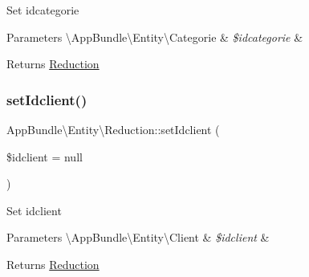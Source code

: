 Set idcategorie


\begin{DoxyParams}[1]{Parameters}
\textbackslash{}\+App\+Bundle\textbackslash{}\+Entity\textbackslash{}\+Categorie & {\em \$idcategorie} & \\
\hline
\end{DoxyParams}
\begin{DoxyReturn}{Returns}
\hyperlink{class_app_bundle_1_1_entity_1_1_reduction}{Reduction} 
\end{DoxyReturn}
\mbox{\label{class_app_bundle_1_1_entity_1_1_reduction_a67f4f6b6ac7199f97845e467653fe98a}} 
\subsubsection{\texorpdfstring{set\+Idclient()}{setIdclient()}}
{\footnotesize\ttfamily App\+Bundle\textbackslash{}\+Entity\textbackslash{}\+Reduction\+::set\+Idclient (\begin{DoxyParamCaption}\item[{\textbackslash{}\hyperlink{class_app_bundle_1_1_entity_1_1_client}{App\+Bundle\textbackslash{}\+Entity\textbackslash{}\+Client}}]{\$idclient = {\ttfamily null} }\end{DoxyParamCaption})}

Set idclient


\begin{DoxyParams}[1]{Parameters}
\textbackslash{}\+App\+Bundle\textbackslash{}\+Entity\textbackslash{}\+Client & {\em \$idclient} & \\
\hline
\end{DoxyParams}
\begin{DoxyReturn}{Returns}
\hyperlink{class_app_bundle_1_1_entity_1_1_reduction}{Reduction} 
\end{DoxyReturn}
\mbox{\label{class_app_bundle_1_1_entity_1_1_reduction_ac355a83af78fbb7081912c9e2ef5be7f}} 
